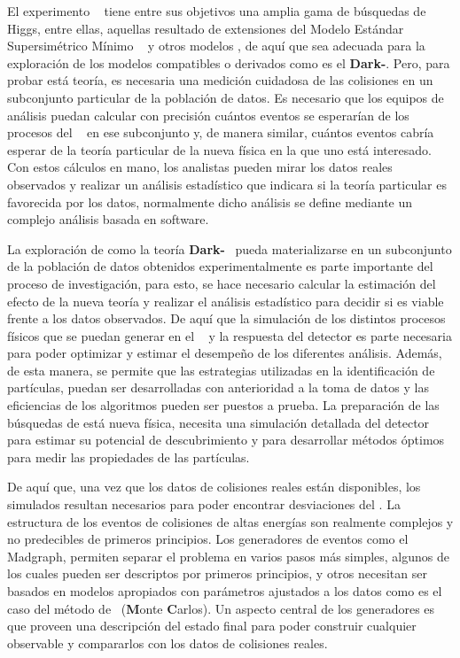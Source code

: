 El experimento \LHC ~ tiene entre sus objetivos una amplia gama de búsquedas de Higgs, entre ellas, aquellas resultado de extensiones del Modelo Estándar Supersimétrico Mínimo \MSSM~ y otros modelos \SUSY, de aquí que sea adecuada para la exploración de los modelos compatibles o derivados como es el \textbf{Dark-}\SUSY. Pero, para probar está teoría, es necesaria una medición cuidadosa de las colisiones en un subconjunto particular de la población de datos. Es necesario que los equipos de análisis puedan calcular con precisión cuántos eventos se esperarían de los procesos del \ME~ en ese subconjunto y, de manera similar, cuántos eventos cabría esperar de la teoría particular de la nueva física en la que uno está interesado. Con estos cálculos en mano, los analistas pueden mirar los datos reales observados y realizar un análisis estadístico que indicara si la teoría particular es favorecida por los datos, normalmente dicho análisis se define mediante un complejo análisis basada en software. %

La exploración de como la teoría \textbf{Dark-}\SUSY ~ pueda materializarse en un subconjunto de la población de datos obtenidos experimentalmente es parte importante del proceso de investigación, para esto, se hace necesario calcular la estimación del efecto de la nueva teoría y realizar el análisis estadístico para decidir si es viable frente a los datos observados. De aquí que la simulación de los distintos procesos físicos que se puedan generar en el \LHC ~ y la respuesta del detector es parte necesaria para poder optimizar y estimar el desempeño de los diferentes análisis. Además, de esta manera, se permite que las estrategias utilizadas en la identificación de partículas, puedan ser desarrolladas con anterioridad a la toma de datos y las eficiencias de los algoritmos pueden ser puestos a prueba. La preparación de las búsquedas de está nueva física, necesita una simulación detallada del detector para estimar su potencial de descubrimiento y para desarrollar métodos óptimos para medir las propiedades de las partículas.

De aquí que, una vez que los datos de colisiones reales están disponibles, los simulados resultan necesarios para poder encontrar desviaciones del \ME. La estructura de los eventos de colisiones de altas energías son realmente complejos y no predecibles de primeros principios. Los generadores de eventos como el Madgraph, permiten separar el problema en varios pasos más simples, algunos de los cuales pueden ser descriptos por primeros principios, y otros necesitan ser basados en modelos apropiados con parámetros ajustados a los datos como es el caso del método de \MC ~(\textbf{M}onte \textbf{C}arlos). Un aspecto central de los generadores es que proveen una descripción del estado final para poder construir cualquier observable y compararlos con los datos de colisiones reales.


